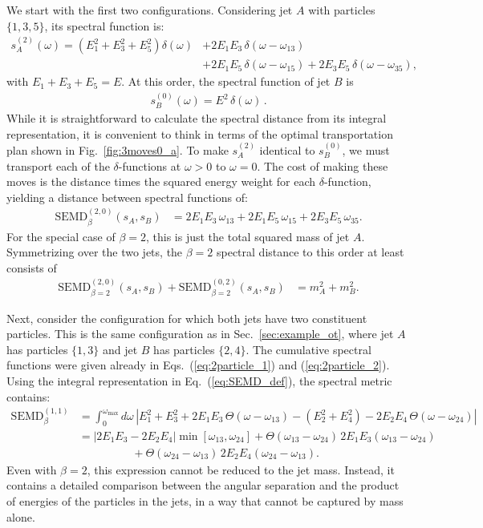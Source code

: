 \documentclass[letterpaper,11pt]{article}
\DeclareRobustCommand{\Sec}[1]{Sec.~\ref{#1}}
\DeclareRobustCommand{\Fig}[1]{Fig.~\ref{#1}}
\DeclareRobustCommand{\Eq}[1]{Eq.~(\ref{#1})}
\DeclareRobustCommand{\Eqs}[2]{Eqs.~(\ref{#1}) and (\ref{#2})}
\begin{document}
We start with the first two configurations.
%
Considering jet $A$ with particles $\{1,3,5\}$, its spectral function is:
\begin{align}\label{eq:spec3mass}
s_A^{(2)}(\omega) = (E_1^2+E_3^2+E_5^2)\delta(\omega) &+ 2E_1E_3\,\delta(\omega-\omega_{13})\\
&+ 2E_1E_5\,\delta(\omega-\omega_{15})+ 2E_3E_5\,\delta(\omega-\omega_{35}),\nonumber
\end{align}
with $E_1+E_3+E_5 = E$.
%
At this order, the spectral function of jet $B$ is
\begin{align}
s^{(0)}_B(\omega) = E^2\,\delta(\omega)\,.
\end{align}
%
While it is straightforward to calculate the spectral distance from its integral representation, it is convenient to think in terms of the optimal transportation plan shown in \Fig{fig:3moves0_a}.
%
To make $s_A^{(2)}$ identical to $s_B^{(0)}$, we must transport each of the $\delta$-functions at $\omega > 0$ to $\omega=0$.
%
The cost of making these moves is the distance times the squared energy weight for each $\delta$-function, yielding a distance between spectral functions of:
%
\begin{align}
\label{eq:spectral20}
\text{SEMD}^{(2,0)}_\beta(s_A, s_B)&= 2E_1 E_3 \, \omega_{13}+2E_1E_5 \, \omega_{15}+2E_3E_5 \, \omega_{35}.
\end{align}
%
For the special case of $\beta = 2$, this is just the total squared mass of jet $A$.
%
Symmetrizing over the two jets, the $\beta = 2$ spectral distance to this order at least consists of
%
\begin{align}\label{eq:massmet3}
\text{SEMD}^{(2,0)}_{\beta=2}(s_A, s_B) + \text{SEMD}^{(0,2)}_{\beta=2}(s_A, s_B)&= m_A^2+m_B^2.
\end{align}



Next, consider the configuration for which both jets have two constituent particles.
%
This is the same configuration as in \Sec{sec:example_ot}, where jet $A$ has particles $\{1,3\}$ and jet $B$ has particles $\{2,4\}$.
%
The cumulative spectral functions were given already in \Eqs{eq:2particle_1}{eq:2particle_2}.
%
Using the integral representation in \Eq{eq:SEMD_def}, the spectral metric contains:
%
\begin{align}
\label{eq:angordmet3}
\text{SEMD}^{(1,1)}_{\beta} &= \int_0^{\omega_{\max}} d \omega \, \left|
E_1^2+E_3^2+2E_1E_3\,\Theta\left(
\omega-\omega_{13}
\right)-(E_2^2+E_4^2)-2E_2E_4\,\Theta\left(
\omega-\omega_{24}
\right)
\right|\nonumber\\
&=|2E_1E_3-2E_2E_4|\min\left[
\omega_{13},\omega_{24}
\right]+\Theta\left(
\omega_{13}-\omega_{24}
\right)\,2E_1E_3\left(
\omega_{13}-\omega_{24}
\right)\nonumber\\
&
\hspace{2cm}
+\Theta\left(
\omega_{24}-\omega_{13}
\right)\,2E_2 E_4\left(
\omega_{24}-\omega_{13}
\right)
.
\end{align}
%
Even with $\beta = 2$, this expression cannot be reduced to the jet mass.
%
Instead, it contains a detailed comparison between the angular separation and the product of energies of the particles in the jets, in a way that cannot be captured by mass alone.
\end{document}

